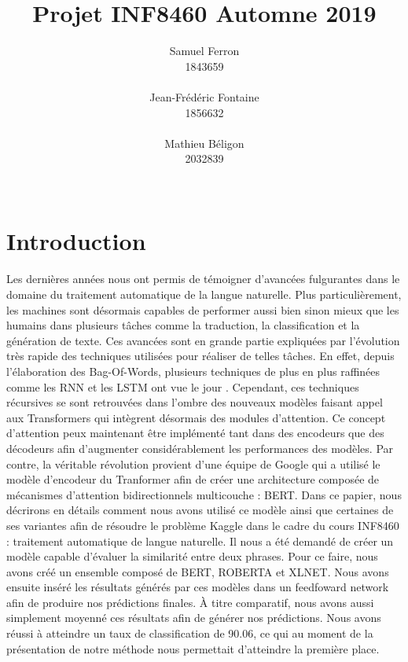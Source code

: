 \documentclass[11pt,a4paper, french]{article}
\title{Projet INF8460 Automne 2019 }
\author{Samuel Ferron \\
  1843659 \\
  {\tt } \\\And
  Jean-Frédéric Fontaine \\
  1856632 \\
  {\tt} \\\And
  Mathieu B\'eligon \\
  2032839\\
  {\tt } \\}
\date{}
\begin{document}
\maketitle

\section{Introduction}
Les dernières années nous ont permis de témoigner d’avancées fulgurantes dans le domaine du traitement automatique de la langue naturelle. Plus particulièrement, les machines sont désormais capables de performer aussi bien sinon mieux que les humains dans plusieurs tâches comme la traduction, la classification et la génération de texte. Ces avancées sont en grande partie expliquées par l’évolution très rapide des techniques utilisées pour réaliser de telles tâches. En effet, depuis l’élaboration des Bag-Of-Words, plusieurs techniques de plus en plus raffinées comme les RNN et les LSTM ont vue le jour \cite{lstm}. Cependant, ces techniques récursives se sont retrouvées dans l’ombre des nouveaux modèles faisant appel aux Transformers qui intègrent désormais des modules d’attention. Ce concept d’attention peux maintenant être implémenté tant dans des encodeurs que des décodeurs afin d’augmenter considérablement les performances des modèles. Par contre, la véritable révolution provient d’une équipe de Google qui a utilisé le modèle d’encodeur du Tranformer afin de créer une architecture composée de mécanismes d’attention bidirectionnels multicouche : BERT. Dans ce papier, nous décrirons en détails comment nous avons utilisé ce modèle ainsi que certaines de ses variantes afin de résoudre le problème Kaggle dans le cadre du cours INF8460 : traitement automatique de langue naturelle. Il nous a été demandé de créer un modèle capable d’évaluer la similarité entre deux phrases. Pour ce faire, nous avons créé un ensemble composé de BERT, ROBERTA et XLNET. Nous avons ensuite inséré les résultats générés par ces modèles dans un feedfoward network afin de produire nos prédictions finales. À titre comparatif, nous avons aussi simplement moyenné ces résultats afin de générer nos prédictions. Nous avons réussi à atteindre un taux de classification de 90.06, ce qui au moment de la présentation de notre méthode nous permettait d'atteindre la première place.
\end{document}
